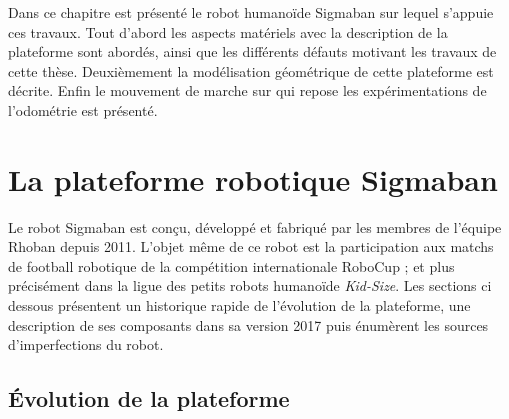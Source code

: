 
Dans ce chapitre est présenté le robot humanoïde Sigmaban sur 
lequel s'appuie ces travaux.
Tout d'abord les aspects matériels avec la description de la plateforme 
sont abordés, ainsi que les différents défauts motivant les travaux de cette thèse. 
Deuxièmement la modélisation géométrique de cette plateforme est décrite. 
Enfin le mouvement de marche sur qui repose les expérimentations de l'odométrie 
est présenté.

\section{La plateforme robotique Sigmaban\label{sec:robot}}

Le robot Sigmaban est conçu, développé et fabriqué 
par les membres de l'équipe Rhoban depuis 2011.
L'objet même de ce robot est la participation aux matchs 
de football robotique de la compétition internationale RoboCup ; et 
plus précisément dans la ligue des petits 
robots humanoïde \textit{Kid-Size}.
Les sections ci dessous présentent un historique rapide
de l'évolution de la plateforme, une description
de ses composants dans sa version 2017 puis énumèrent
les sources d'imperfections du robot.

\subsection{Évolution de la plateforme}

